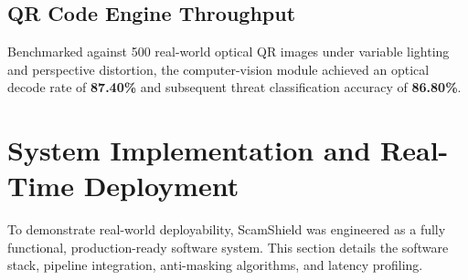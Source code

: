 \documentclass[conference]{IEEEtran}
\begin{document}
\subsection{QR Code Engine Throughput}
Benchmarked against 500 real-world optical QR images under variable lighting and perspective distortion, the computer-vision module achieved an optical decode rate of \textbf{87.40\%} and subsequent threat classification accuracy of \textbf{86.80\%}.

\section{System Implementation and Real-Time Deployment}
To demonstrate real-world deployability, ScamShield was engineered as a fully functional, production-ready software system. This section details the software stack, pipeline integration, anti-masking algorithms, and latency profiling.
\end{document}
